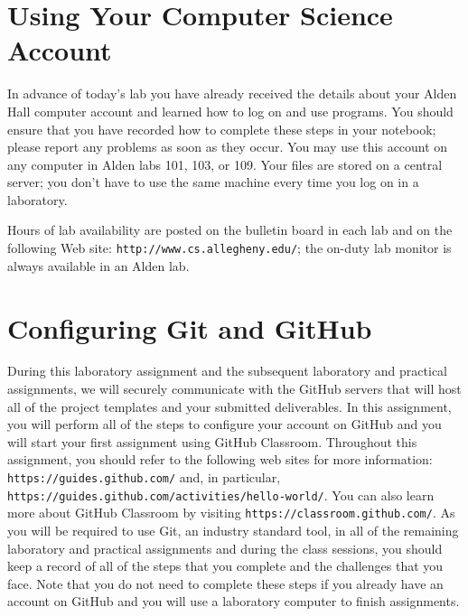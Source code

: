\documentclass[11pt]{article}
\newcommand{\url}[1]{\lstinline{#1}}
\begin{document}
\section*{Using Your Computer Science Account}

In advance of today's lab you have already received the details about your Alden Hall computer account and learned how
to log on and use programs. You should ensure that you have recorded how to complete these steps in your notebook;
please report any problems as soon as they occur. You may use this account on any computer in Alden labs 101, 103, or
109. Your files are stored on a central server; you don't have to use the same machine every time you log on in a
laboratory.

Hours of lab availability are posted on the bulletin board in each lab and on the following Web site:
\url{http://www.cs.allegheny.edu/}; the on-duty lab monitor is always available in an Alden lab.

\section*{Configuring Git and GitHub}


During this laboratory assignment and the subsequent laboratory and practical assignments, we will securely communicate
with the GitHub servers that will host all of the project templates and your submitted deliverables. In this assignment,
you will perform all of the steps to configure your account on GitHub and you will start your first assignment using
GitHub Classroom. Throughout this assignment, you should refer to the following web sites for more information:
\url{https://guides.github.com/} and, in particular, \url{https://guides.github.com/activities/hello-world/}. You can
also learn more about GitHub Classroom by visiting \url{https://classroom.github.com/}. As you will be required to use
Git, an industry standard tool, in all of the remaining laboratory and practical assignments and during the class
sessions, you should keep a record of all of the steps that you complete and the challenges that you face. Note that you
do not need to complete these steps if you already have an account on GitHub and you will use a laboratory computer to
finish assignments.
\end{document}
